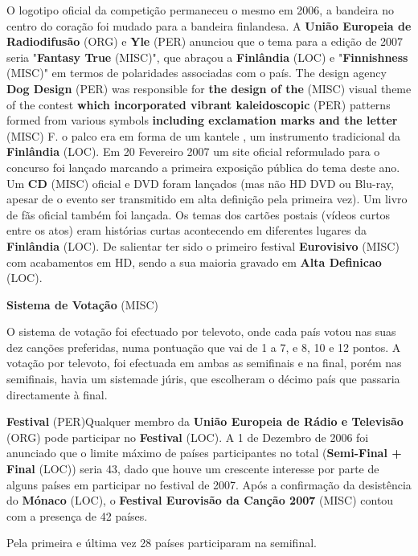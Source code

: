 \documentclass[12pt,a4paper]{article}
\begin{document}
O logotipo oficial da competição permaneceu o mesmo em 2006, a bandeira no centro do coração foi mudado para a bandeira finlandesa. A \textbf{União Europeia de Radiodifusão} (ORG) e \textbf{Yle} (PER) anunciou que o tema para a edição de 2007 seria "\textbf{Fantasy True} (MISC)", que abraçou a \textbf{Finlândia} (LOC) e "\textbf{Finnishness} (MISC)" em termos de polaridades associadas com o país. The design agency \textbf{Dog Design} (PER) was responsible for \textbf{the design of the} (MISC) visual theme of the contest \textbf{which incorporated vibrant kaleidoscopic} (PER) patterns formed from various symbols \textbf{including exclamation marks and the letter} (MISC) F. o palco era em forma de um kantele , um instrumento tradicional da \textbf{Finlândia} (LOC). Em 20 Fevereiro 2007 um site oficial reformulado para o concurso foi lançado marcando a primeira exposição pública do tema deste ano. Um \textbf{CD} (MISC) oficial e DVD foram lançados (mas não HD DVD ou Blu-ray, apesar de o evento ser transmitido em alta definição pela primeira vez). Um livro de fãs oficial também foi lançada. Os temas dos cartões postais (vídeos curtos entre os atos) eram histórias curtas acontecendo em diferentes lugares da \textbf{Finlândia} (LOC). De salientar ter sido o primeiro festival \textbf{Eurovisivo} (MISC) com acabamentos em HD, sendo a sua maioria gravado em \textbf{Alta Definicao} (LOC).



\textbf{Sistema de Votação} (MISC)

O sistema de votação foi efectuado por televoto, onde cada país votou nas suas dez canções preferidas, numa pontuação que vai de 1 a 7, e 8, 10 e 12 pontos. A votação por televoto, foi efectuada em ambas as semifinais e na final, porém nas semifinais, havia um sistemade júris, que escolheram o décimo país que passaria directamente à final.



\textbf{Festival} (PER)Qualquer membro da \textbf{União Europeia de Rádio e Televisão} (ORG) pode participar no \textbf{Festival} (LOC). A 1 de Dezembro de 2006 foi anunciado que o limite máximo de países participantes no total (\textbf{Semi-Final + Final} (LOC)) seria 43, dado que houve um crescente interesse por parte de alguns países em participar no festival de 2007. Após a confirmação da desistência do \textbf{Mónaco} (LOC), o \textbf{Festival Eurovisão da Canção 2007} (MISC) contou com a presença de 42 países.

Pela primeira e última vez 28 países participaram na semifinal.
\end{document}
